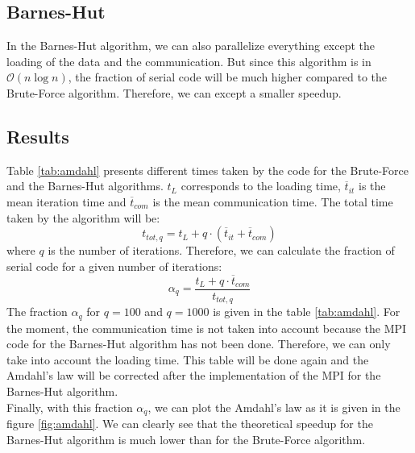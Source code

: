 \documentclass[11pt,a4paper]{article}
\begin{document}
\subsection{Barnes-Hut}

In the Barnes-Hut algorithm, we can also parallelize everything except the loading of the data and the communication. But since this algorithm is in $\mathcal{O}(n\log n)$, the fraction of serial code will be much higher compared to the Brute-Force algorithm. Therefore, we can except a smaller speedup.

\subsection{Results}

Table \ref{tab:amdahl} presents different times taken by the code for the Brute-Force and the Barnes-Hut algorithms. $t_L$ corresponds to the loading time, $\overline{t}_{it}$ is the mean iteration time and  $\overline{t}_{com}$ is the mean communication time. The total time taken by the algorithm will be:
\begin{equation}
t_{tot,q} = t_L + q\cdot(\overline{t}_{it} + \overline{t}_{com})
\end{equation}
where $q$ is the number of iterations. Therefore, we can calculate the fraction of serial code for a given number of iterations:
\begin{equation}
\alpha_q = \frac{t_L + q\cdot \overline{t}_{com}}{t_{tot,q}}
\end{equation}
The fraction $\alpha_q$ for $q=100$ and $q=1000$ is given in the table \ref{tab:amdahl}. For the moment, the communication time is not taken into account because the MPI code for the Barnes-Hut algorithm has not been done. Therefore, we can only take into account the loading time. This table will be done again and the Amdahl's law will be corrected after the implementation of the MPI for the Barnes-Hut algorithm.
\\
Finally, with this fraction $\alpha_q$, we can plot the Amdahl's law as it is given in the figure \ref{fig:amdahl}. We can clearly see that the theoretical speedup for the Barnes-Hut algorithm is much lower than for the Brute-Force algorithm. 
\end{document}
